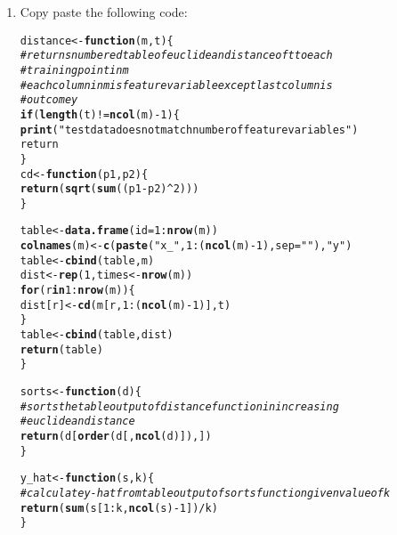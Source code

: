 \documentclass[../../dsa1101_notes.Rtex]{subfiles}\usepackage[]{graphicx}\usepackage[]{color}
\makeatletter
\newcommand{\hlnum}[1]{\textcolor[rgb]{0.686,0.059,0.569}{#1}}%
\newcommand{\hlstr}[1]{\textcolor[rgb]{0.192,0.494,0.8}{#1}}%
\newcommand{\hlcom}[1]{\textcolor[rgb]{0.678,0.584,0.686}{\textit{#1}}}%
\newcommand{\hlopt}[1]{\textcolor[rgb]{0,0,0}{#1}}%
\newcommand{\hlstd}[1]{\textcolor[rgb]{0.345,0.345,0.345}{#1}}%
\newcommand{\hlkwa}[1]{\textcolor[rgb]{0.161,0.373,0.58}{\textbf{#1}}}%
\newcommand{\hlkwb}[1]{\textcolor[rgb]{0.69,0.353,0.396}{#1}}%
\newcommand{\hlkwc}[1]{\textcolor[rgb]{0.333,0.667,0.333}{#1}}%
\newcommand{\hlkwd}[1]{\textcolor[rgb]{0.737,0.353,0.396}{\textbf{#1}}}%
\newenvironment{kframe}{%
 \def\at@end@of@kframe{}%
 \ifinner\ifhmode%
  \def\at@end@of@kframe{\end{minipage}}%
  \begin{minipage}{\columnwidth}%
 \fi\fi%
 \def\FrameCommand##1{\hskip\@totalleftmargin \hskip-\fboxsep
 \colorbox{shadecolor}{##1}\hskip-\fboxsep
     \hskip-\linewidth \hskip-\@totalleftmargin \hskip\columnwidth}%
 \MakeFramed {\advance\hsize-\width
   \@totalleftmargin\z@ \linewidth\hsize
   \@setminipage}}%
 {\par\unskip\endMakeFramed%
 \at@end@of@kframe}
\newenvironment{knitrout}{}{} %
\makeatother
\begin{document}
\begin{enumerate}
  \item Copy paste the following code:
\begin{knitrout}
\color{fgcolor}\begin{kframe}
\begin{alltt}
\hlstd{distance} \hlkwb{<-} \hlkwa{function}\hlstd{(}\hlkwc{m}\hlstd{,} \hlkwc{t}\hlstd{) \{}
  \hlcom{# returns numbered table of euclidean distance of t to each}
  \hlcom{# training point in m}
  \hlcom{# each column in m is feature variable except last column is}
  \hlcom{# outcome y}
  \hlkwa{if} \hlstd{(}\hlkwd{length}\hlstd{(t)} \hlopt{!=} \hlkwd{ncol}\hlstd{(m)}\hlopt{-}\hlnum{1}\hlstd{) \{}
    \hlkwd{print}\hlstd{(}\hlstr{"test data does not match number of feature variables"}\hlstd{)}
    \hlstd{return}
  \hlstd{\}}
  \hlstd{cd} \hlkwb{<-} \hlkwa{function}\hlstd{(}\hlkwc{p1}\hlstd{,} \hlkwc{p2}\hlstd{) \{}
    \hlkwd{return} \hlstd{(}\hlkwd{sqrt}\hlstd{(}\hlkwd{sum}\hlstd{((p1}\hlopt{-}\hlstd{p2)}\hlopt{^}\hlnum{2}\hlstd{)))}
  \hlstd{\}}

  \hlstd{table} \hlkwb{<-} \hlkwd{data.frame}\hlstd{(}\hlkwc{id} \hlstd{=} \hlnum{1}\hlopt{:}\hlkwd{nrow}\hlstd{(m))}
  \hlkwd{colnames}\hlstd{(m)} \hlkwb{<-} \hlkwd{c}\hlstd{(}\hlkwd{paste}\hlstd{(}\hlstr{"x_"}\hlstd{,} \hlnum{1}\hlopt{:}\hlstd{(}\hlkwd{ncol}\hlstd{(m)}\hlopt{-}\hlnum{1}\hlstd{),} \hlkwc{sep} \hlstd{=} \hlstr{""}\hlstd{),} \hlstr{"y"}\hlstd{)}
  \hlstd{table} \hlkwb{<-} \hlkwd{cbind}\hlstd{(table, m)}
  \hlstd{dist} \hlkwb{<-} \hlkwd{rep}\hlstd{(}\hlnum{1}\hlstd{, times}\hlkwb{<-}\hlkwd{nrow}\hlstd{(m))}
  \hlkwa{for} \hlstd{(r} \hlkwa{in} \hlnum{1}\hlopt{:}\hlkwd{nrow}\hlstd{(m)) \{}
    \hlstd{dist[r]} \hlkwb{<-} \hlkwd{cd}\hlstd{(m[r,} \hlnum{1}\hlopt{:}\hlstd{(}\hlkwd{ncol}\hlstd{(m)}\hlopt{-}\hlnum{1}\hlstd{)], t)}
  \hlstd{\}}
  \hlstd{table} \hlkwb{<-} \hlkwd{cbind}\hlstd{(table, dist)}
  \hlkwd{return} \hlstd{(table)}
\hlstd{\}}

\hlstd{sorts} \hlkwb{<-} \hlkwa{function}\hlstd{(}\hlkwc{d}\hlstd{) \{}
  \hlcom{# sorts the table output of distance function in increasing}
  \hlcom{# euclidean distance}
  \hlkwd{return} \hlstd{(d[}\hlkwd{order}\hlstd{(d[,} \hlkwd{ncol}\hlstd{(d)]), ])}
\hlstd{\}}

\hlstd{y_hat} \hlkwb{<-} \hlkwa{function}\hlstd{(}\hlkwc{s}\hlstd{,} \hlkwc{k}\hlstd{) \{}
 \hlcom{# calculate y-hat from table output of sorts function given value of k}
 \hlkwd{return} \hlstd{(}\hlkwd{sum}\hlstd{(s[}\hlnum{1}\hlopt{:}\hlstd{k,} \hlkwd{ncol}\hlstd{(s)}\hlopt{-}\hlnum{1}\hlstd{])}\hlopt{/}\hlstd{k)}
\hlstd{\}}


\end{alltt}
\end{kframe}
\end{knitrout}
\end{enumerate}
\end{document}
